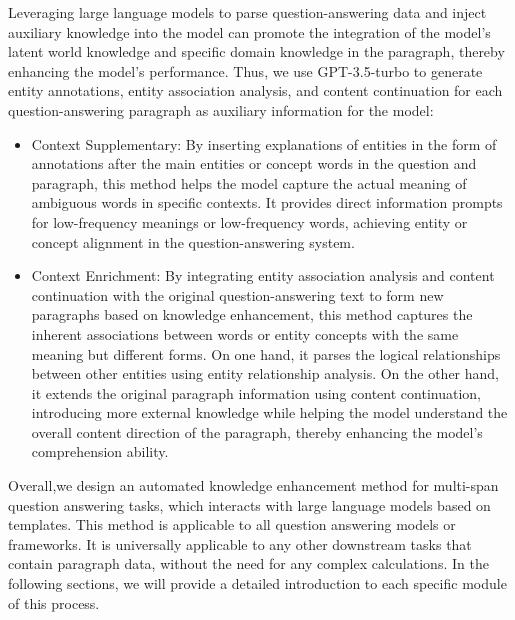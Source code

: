 \documentclass[mathematics,article,submit,moreauthors]{Definitions/mdpi}
\newcommand{\1}[1]{\mathds{1}\left[#1\right]}
\begin{document}
	Leveraging large language models to parse question-answering data and inject auxiliary knowledge into the model can promote the integration of the model's latent world knowledge and specific domain knowledge in the paragraph, thereby enhancing the model's performance. Thus, we use GPT-3.5-turbo to generate entity annotations, entity association analysis, and content continuation for each question-answering paragraph as auxiliary information for the model:
	\begin{itemize}
		\item Context Supplementary: By inserting explanations of entities in the form of annotations after the main entities or concept words in the question and paragraph, this method helps the model capture the actual meaning of ambiguous words in specific contexts. It provides direct information prompts for low-frequency meanings or low-frequency words, achieving entity or concept alignment in the question-answering system.
		\item Context Enrichment: By integrating entity association analysis and content continuation with the original question-answering text to form new paragraphs based on knowledge enhancement, this method captures the inherent associations between words or entity concepts with the same meaning but different forms. On one hand, it parses the logical relationships between other entities using entity relationship analysis. On the other hand, it extends the original paragraph information using content continuation, introducing more external knowledge while helping the model understand the overall content direction of the paragraph, thereby enhancing the model's comprehension ability.
	\end{itemize}
	
	Overall,we design an automated knowledge enhancement method for multi-span question answering tasks, which interacts with large language models based on templates. This method is applicable to all question answering models or frameworks. It is universally applicable to any other downstream tasks that contain paragraph data, without the need for any complex calculations. In the following sections, we will provide a detailed introduction to each specific module of this process.
\end{document}
